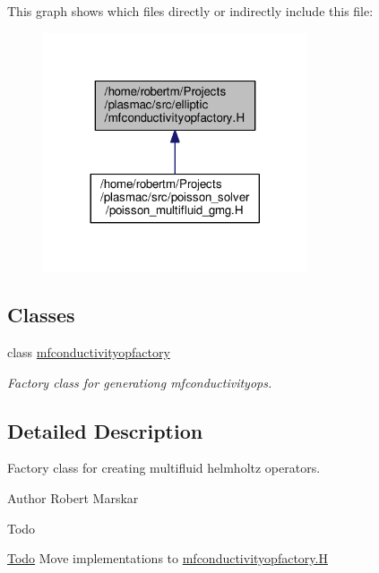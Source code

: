 This graph shows which files directly or indirectly include this file\+:\nopagebreak
\begin{figure}[H]
\begin{center}
\leavevmode
\includegraphics[width=221pt]{mfconductivityopfactory_8H__dep__incl}
\end{center}
\end{figure}
\subsection*{Classes}
\begin{DoxyCompactItemize}
\item 
class \hyperlink{classmfconductivityopfactory}{mfconductivityopfactory}
\begin{DoxyCompactList}\small\item\em Factory class for generationg mfconductivityop\textquotesingle{}s. \end{DoxyCompactList}\end{DoxyCompactItemize}


\subsection{Detailed Description}
Factory class for creating multifluid helmholtz operators. 

\begin{DoxyAuthor}{Author}
Robert Marskar 
\end{DoxyAuthor}
\begin{DoxyRefDesc}{Todo}
\item[\hyperlink{todo__todo000001}{Todo}]Move implementations to \hyperlink{mfconductivityopfactory_8H}{mfconductivityopfactory.\+H} \end{DoxyRefDesc}
